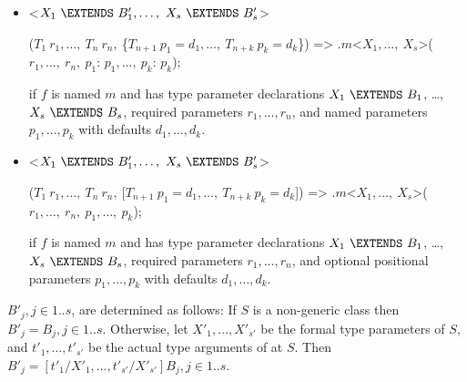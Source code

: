 \documentclass{article}
\begin{document}
\LMHash{}
\begin{itemize}
\item
\begin{dartCode}
<$X_1\ \EXTENDS\ B'_1, \ldots,\ X_s\ \EXTENDS\ B'_s$>

($T_1\ r_1, \ldots,\ T_n\ r_n,\ $\{$T_{n+1}\ p_1 = d_1, \ldots,\ T_{n+k}\ p_k = d_k$\}) =>
    \SUPER$.m$<$X_1, \ldots,\ X_s$>($r_1, \ldots,\ r_n,\ p_1$: $p_1, \ldots,\ p_k$: $p_k$);
\end{dartCode}
if $f$ is named $m$ and has type parameter declarations
$X_1\ \EXTENDS\ B_1$, \ldots,\ $X_s\ \EXTENDS\ B_s$,
required parameters $r_1, \ldots, r_n$,
and named parameters $p_1, \ldots, p_k$ with defaults $d_1, \ldots, d_k$.
\item
\begin{dartCode}
<$X_1\ \EXTENDS\ B'_1, \ldots,\ X_s\ \EXTENDS\ B'_s$>

($T_1\ r_1, \ldots,\ T_n\ r_n,\ $[$T_{n+1}\ p_1 = d_1, \ldots,\ T_{n+k}\ p_k = d_k$]) =>
    \SUPER.$m$<$X_1, \ldots,\ X_s$>($r_1, \ldots,\ r_n,\ p_1, \ldots,\ p_k$);
\end{dartCode}
if $f$ is named $m$ and has type parameter declarations
$X_1\ \EXTENDS\ B_1$, \ldots,\ $X_s\ \EXTENDS\ B_s$,
required parameters $r_1, \ldots, r_n$,
and optional positional parameters $p_1, \ldots, p_k$ with defaults $d_1, \ldots, d_k$.
\end{itemize}


\LMHash{}
$B'_j, j \in 1 .. s$, are determined as follows:
If $S$ is a non-generic class then $B'_j = B_j, j \in 1 .. s$.
Otherwise, let $X'_1, \ldots, X'_{s'}$ be the formal type parameters of $S$,
and $t'_1, \ldots, t'_{s'}$ be the actual type arguments of \THIS{} at $S$.
Then $B'_j = [t'_1/X'_1, \ldots, t'_{s'}/X'_{s'}]B_j, j \in 1 .. s$.

\end{document}
